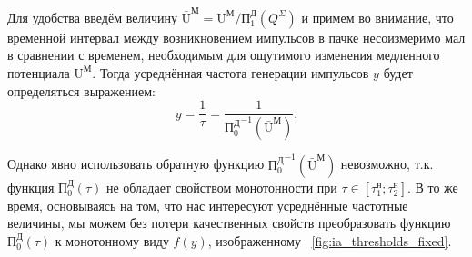 
Для удобства введём величину $\bar{\text{U}}^\text{М} = \text{U}^\text{М} / \text{П}_{1}^\text{Д}(Q^\Sigma)$ и примем во внимание, что временной интервал между возникновением импульсов в пачке несоизмеримо мал в сравнении с временем, необходимым для ощутимого изменения медленного потенциала $\text{U}^\text{М}$. Тогда усреднённая частота генерации импульсов $y$ будет определяться выражением: 
$$ y = \dfrac{1}{\tau} = \dfrac{1}{{\text{П}_{0}^\text{Д}}^{-1}(\bar{\text{U}}^\text{М})}.$$

Однако явно использовать обратную функцию ${\text{П}_{0}^\text{Д}}^{-1}(\bar{\text{U}}^\text{М})$ невозможно, т.к. функция $\text{П}_{0}^\text{Д}(\tau)$ не обладает свойством монотонности при $\tau \in \left[ \tau_{1}^{\text{н}}; \tau_{2}^{\text{н}} \right]$. В то же время, основываясь на том, что нас интересуют усреднённые частотные величины, мы можем без потери качественных свойств преобразовать функцию $\text{П}_{0}^\text{Д}(\tau)$ к монотонному виду $f(y)$, изображенному \onfigure~\ref{fig:ia_thresholds_fixed}.


